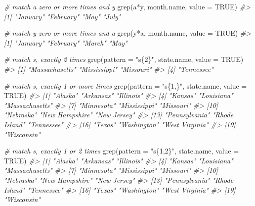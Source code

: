 \documentclass[
]{book}
\newenvironment{Shaded}{\begin{snugshade}}{\end{snugshade}}
\newcommand{\AttributeTok}[1]{\textcolor[rgb]{0.77,0.63,0.00}{#1}}
\newcommand{\CommentTok}[1]{\textcolor[rgb]{0.56,0.35,0.01}{\textit{#1}}}
\newcommand{\ConstantTok}[1]{\textcolor[rgb]{0.00,0.00,0.00}{#1}}
\newcommand{\FunctionTok}[1]{\textcolor[rgb]{0.00,0.00,0.00}{#1}}
\newcommand{\NormalTok}[1]{#1}
\newcommand{\StringTok}[1]{\textcolor[rgb]{0.31,0.60,0.02}{#1}}
\begin{document}
\begin{Shaded}
\begin{Highlighting}[]
\CommentTok{\# match \textquotesingle{}a\textquotesingle{} zero or more times and \textquotesingle{}y\textquotesingle{}}
\FunctionTok{grep}\NormalTok{(}\StringTok{\textquotesingle{}a*y\textquotesingle{}}\NormalTok{, month.name, }\AttributeTok{value =} \ConstantTok{TRUE}\NormalTok{)}
\CommentTok{\#\textgreater{} [1] "January"  "February" "May"      "July"}

\CommentTok{\# match \textquotesingle{}y\textquotesingle{} zero or more times and \textquotesingle{}a\textquotesingle{}}
\FunctionTok{grep}\NormalTok{(}\StringTok{\textquotesingle{}y*a\textquotesingle{}}\NormalTok{, month.name, }\AttributeTok{value =} \ConstantTok{TRUE}\NormalTok{)}
\CommentTok{\#\textgreater{} [1] "January"  "February" "March"    "May"}

\CommentTok{\# match \textquotesingle{}s\textquotesingle{}, exactly 2 times}
\FunctionTok{grep}\NormalTok{(}\AttributeTok{pattern =} \StringTok{"s\{2\}"}\NormalTok{, state.name, }\AttributeTok{value =} \ConstantTok{TRUE}\NormalTok{)}
\CommentTok{\#\textgreater{} [1] "Massachusetts" "Mississippi"   "Missouri"     }
\CommentTok{\#\textgreater{} [4] "Tennessee"}

\CommentTok{\# match \textquotesingle{}s\textquotesingle{}, exactly 1 or more times}
\FunctionTok{grep}\NormalTok{(}\AttributeTok{pattern =} \StringTok{"s\{1,\}"}\NormalTok{, state.name, }\AttributeTok{value =} \ConstantTok{TRUE}\NormalTok{)}
\CommentTok{\#\textgreater{}  [1] "Alaska"        "Arkansas"      "Illinois"     }
\CommentTok{\#\textgreater{}  [4] "Kansas"        "Louisiana"     "Massachusetts"}
\CommentTok{\#\textgreater{}  [7] "Minnesota"     "Mississippi"   "Missouri"     }
\CommentTok{\#\textgreater{} [10] "Nebraska"      "New Hampshire" "New Jersey"   }
\CommentTok{\#\textgreater{} [13] "Pennsylvania"  "Rhode Island"  "Tennessee"    }
\CommentTok{\#\textgreater{} [16] "Texas"         "Washington"    "West Virginia"}
\CommentTok{\#\textgreater{} [19] "Wisconsin"}

\CommentTok{\# match \textquotesingle{}s\textquotesingle{}, exactly 1 or 2 times}
\FunctionTok{grep}\NormalTok{(}\AttributeTok{pattern =} \StringTok{"s\{1,2\}"}\NormalTok{, state.name, }\AttributeTok{value =} \ConstantTok{TRUE}\NormalTok{)}
\CommentTok{\#\textgreater{}  [1] "Alaska"        "Arkansas"      "Illinois"     }
\CommentTok{\#\textgreater{}  [4] "Kansas"        "Louisiana"     "Massachusetts"}
\CommentTok{\#\textgreater{}  [7] "Minnesota"     "Mississippi"   "Missouri"     }
\CommentTok{\#\textgreater{} [10] "Nebraska"      "New Hampshire" "New Jersey"   }
\CommentTok{\#\textgreater{} [13] "Pennsylvania"  "Rhode Island"  "Tennessee"    }
\CommentTok{\#\textgreater{} [16] "Texas"         "Washington"    "West Virginia"}
\CommentTok{\#\textgreater{} [19] "Wisconsin"}
\end{Highlighting}
\end{Shaded}
\end{document}
